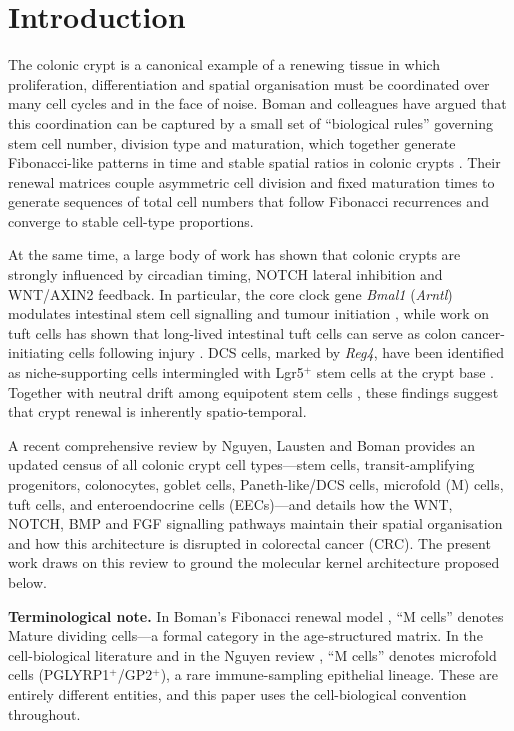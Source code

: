 \documentclass[11pt,letterpaper]{article}
\theoremstyle{definition}
\theoremstyle{remark}
\begin{document}
\tableofcontents
\newpage

\section{Introduction}

The colonic crypt is a canonical example of a renewing tissue in which proliferation, differentiation and spatial organisation must be coordinated over many cell cycles and in the face of noise. Boman and colleagues have argued that this coordination can be captured by a small set of ``biological rules'' governing stem cell number, division type and maturation, which together generate Fibonacci-like patterns in time and stable spatial ratios in colonic crypts \citep{boman2017fibonacci, boman2025dynamic}. Their renewal matrices couple asymmetric cell division and fixed maturation times to generate sequences of total cell numbers that follow Fibonacci recurrences and converge to stable cell-type proportions.

At the same time, a large body of work has shown that colonic crypts are strongly influenced by circadian timing, NOTCH lateral inhibition and WNT/AXIN2 feedback. In particular, the core clock gene \textit{Bmal1} (\textit{Arntl}) modulates intestinal stem cell signalling and tumour initiation \citep{stokes2021bmal1}, while work on tuft cells has shown that long-lived intestinal tuft cells can serve as colon cancer-initiating cells following injury \citep{westphalen2014tuft}. DCS cells, marked by \textit{Reg4}, have been identified as niche-supporting cells intermingled with Lgr5$^+$ stem cells at the crypt base \citep{sasaki2016reg4}. Together with neutral drift among equipotent stem cells \citep{lopezgarcia2010neutral}, these findings suggest that crypt renewal is inherently spatio-temporal.

A recent comprehensive review by Nguyen, Lausten and Boman \citep{nguyen2025colonic} provides an updated census of all colonic crypt cell types---stem cells, transit-amplifying progenitors, colonocytes, goblet cells, Paneth-like/DCS cells, microfold (M) cells, tuft cells, and enteroendocrine cells (EECs)---and details how the WNT, NOTCH, BMP and FGF signalling pathways maintain their spatial organisation and how this architecture is disrupted in colorectal cancer (CRC). The present work draws on this review to ground the molecular kernel architecture proposed below.

\textbf{Terminological note.} In Boman's Fibonacci renewal model \citep{boman2017fibonacci}, ``M cells'' denotes Mature dividing cells---a formal category in the age-structured matrix. In the cell-biological literature and in the Nguyen review \citep{nguyen2025colonic}, ``M cells'' denotes microfold cells (PGLYRP1$^+$/GP2$^+$), a rare immune-sampling epithelial lineage. These are entirely different entities, and this paper uses the cell-biological convention throughout.
\end{document}
